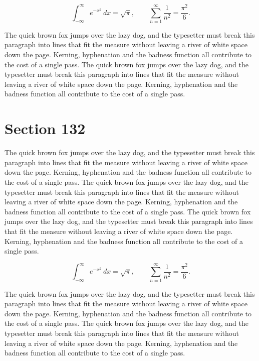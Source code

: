 \documentclass{article}
\begin{document}
\begin{equation}
\int_{-\infty}^{\infty} e^{-x^{2}}\,dx = \sqrt{\pi}, \qquad
\sum_{n=1}^{\infty} \frac{1}{n^{2}} = \frac{\pi^{2}}{6}.
\end{equation}

The quick brown fox jumps over the lazy dog, and the typesetter must break this paragraph into lines that fit the measure without leaving a river of white space down the page. Kerning, hyphenation and the badness function all contribute to the cost of a single pass. The quick brown fox jumps over the lazy dog, and the typesetter must break this paragraph into lines that fit the measure without leaving a river of white space down the page. Kerning, hyphenation and the badness function all contribute to the cost of a single pass. 
\section{Section 132}
The quick brown fox jumps over the lazy dog, and the typesetter must break this paragraph into lines that fit the measure without leaving a river of white space down the page. Kerning, hyphenation and the badness function all contribute to the cost of a single pass. The quick brown fox jumps over the lazy dog, and the typesetter must break this paragraph into lines that fit the measure without leaving a river of white space down the page. Kerning, hyphenation and the badness function all contribute to the cost of a single pass. The quick brown fox jumps over the lazy dog, and the typesetter must break this paragraph into lines that fit the measure without leaving a river of white space down the page. Kerning, hyphenation and the badness function all contribute to the cost of a single pass. 

\begin{equation}
\int_{-\infty}^{\infty} e^{-x^{2}}\,dx = \sqrt{\pi}, \qquad
\sum_{n=1}^{\infty} \frac{1}{n^{2}} = \frac{\pi^{2}}{6}.
\end{equation}

The quick brown fox jumps over the lazy dog, and the typesetter must break this paragraph into lines that fit the measure without leaving a river of white space down the page. Kerning, hyphenation and the badness function all contribute to the cost of a single pass. The quick brown fox jumps over the lazy dog, and the typesetter must break this paragraph into lines that fit the measure without leaving a river of white space down the page. Kerning, hyphenation and the badness function all contribute to the cost of a single pass. 
\end{document}
